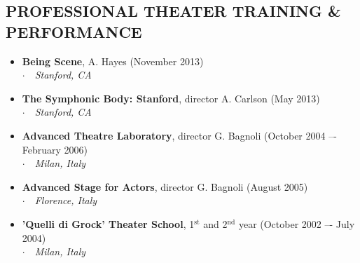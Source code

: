 \documentclass[line,margin]{res}
\newcommand{\superscript}[1]{\ensuremath{^{\textrm{#1}}}}
\newcommand{\placestyle}[1]{\footnotesize $\cdot$\ \ {\emph{#1}}}
\newcommand{\datestyle}[1]{{\tiny \dotfill} {\small (#1)}}
\begin{document}
\begin{resume}
\section{PROFESSIONAL THEATER TRAINING \& PERFORMANCE}
\begin{itemize}
\item {\bf Being Scene}, A. Hayes \datestyle{November 2013} \\
  { \placestyle{Stanford, CA} }
\item {\bf The Symphonic Body: Stanford}, director A. Carlson \datestyle{May 2013} \\
  { \placestyle{Stanford, CA} }
\item {\bf Advanced Theatre Laboratory}, director G. Bagnoli \datestyle{October 2004 –- February 2006} \\
  { \placestyle{Milan, Italy} }
\item {\bf Advanced Stage for Actors}, director G. Bagnoli \datestyle{August 2005} \\
  { \placestyle{Florence, Italy} }
\item {\bf 'Quelli di Grock' Theater School}, 1\superscript{st} and 2\superscript{nd} year \datestyle{October 2002 –- July 2004} \\
  { \placestyle{Milan, Italy} }
\end{itemize}

\end{resume}
\end{document}
